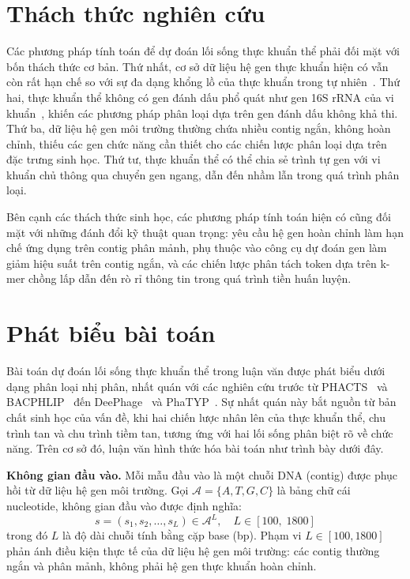 \section{Thách thức nghiên cứu}
\label{sec:challenges}

Các phương pháp tính toán để dự đoán lối sống thực khuẩn thể phải đối mặt với bốn thách thức cơ bản. Thứ nhất, cơ sở dữ liệu hệ gen thực khuẩn hiện có vẫn còn rất hạn chế so với sự đa dạng khổng lồ của thực khuẩn trong tự nhiên~\cite{rolland2024phagedive}. Thứ hai, thực khuẩn thể không có gen đánh dấu phổ quát như gen 16S rRNA của vi khuẩn~\cite{schackart2023evaluation}, khiến các phương pháp phân loại dựa trên gen đánh dấu không khả thi. Thứ ba, dữ liệu hệ gen môi trường thường chứa nhiều contig ngắn, không hoàn chỉnh, thiếu các gen chức năng cần thiết cho các chiến lược phân loại dựa trên đặc trưng sinh học. Thứ tư, thực khuẩn thể có thể chia sẻ trình tự gen với vi khuẩn chủ thông qua chuyển gen ngang, dẫn đến nhầm lẫn trong quá trình phân loại.

Bên cạnh các thách thức sinh học, các phương pháp tính toán hiện có cũng đối mặt với những đánh đổi kỹ thuật quan trọng: yêu cầu hệ gen hoàn chỉnh làm hạn chế ứng dụng trên contig phân mảnh, phụ thuộc vào công cụ dự đoán gen làm giảm hiệu suất trên contig ngắn, và các chiến lược phân tách token dựa trên k-mer chồng lấp dẫn đến rò rỉ thông tin trong quá trình tiền huấn luyện.

\section{Phát biểu bài toán}
\label{sec:problem_formulation}

Bài toán dự đoán lối sống thực khuẩn thể trong luận văn được phát biểu dưới dạng phân loại nhị phân, nhất quán với các nghiên cứu trước từ PHACTS~\cite{mcnair2012phacts} và BACPHLIP~\cite{hockenberry2021bacphlip} đến DeePhage~\cite{wu2021deephage} và PhaTYP~\cite{shang2023phatyp}. Sự nhất quán này bắt nguồn từ bản chất sinh học của vấn đề, khi hai chiến lược nhân lên của thực khuẩn thể, chu trình tan và chu trình tiềm tan, tương ứng với hai lối sống phân biệt rõ về chức năng. Trên cơ sở đó, luận văn hình thức hóa bài toán như trình bày dưới đây.

\textbf{Không gian đầu vào.} Mỗi mẫu đầu vào là một chuỗi DNA (contig) được phục hồi từ dữ liệu hệ gen môi trường. Gọi $\mathcal{A} = \{A, T, G, C\}$ là bảng chữ cái nucleotide, không gian đầu vào được định nghĩa:
\begin{equation}
    s = (s_1, s_2, \ldots, s_L) \in \mathcal{A}^L, \quad L \in [100,\; 1800]
    \label{eq:input_space}
\end{equation}
trong đó $L$ là độ dài chuỗi tính bằng cặp base (bp). Phạm vi $L \in [100, 1800]$ phản ánh điều kiện thực tế của dữ liệu hệ gen môi trường: các contig thường ngắn và phân mảnh, không phải hệ gen thực khuẩn hoàn chỉnh.

